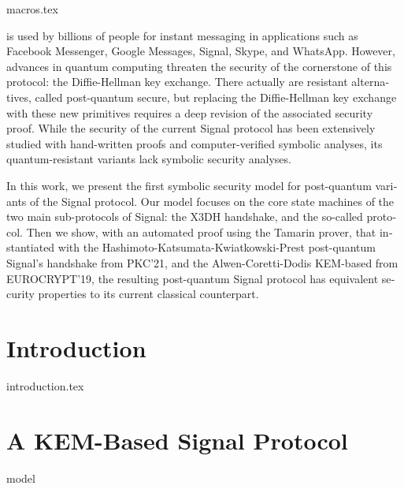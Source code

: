 
\newcommand{\vs}[1]{\vspace*{-#1mm}}

{macros.tex}

\begin{refsegment}
 \label{cha:PQSignal}

\begin{english}

 is used by billions of people for instant 
messaging in applications such as Facebook Messenger, Google Messages, Signal, 
Skype, and WhatsApp. However, advances in quantum computing threaten the 
security of the cornerstone of this protocol: the Diffie-Hellman key exchange. 
There actually are resistant alternatives, called post-quantum secure, but 
replacing the Diffie-Hellman key exchange with these new primitives requires a 
deep revision of the associated security proof. While the security of the 
current Signal protocol has been extensively studied with hand-written proofs 
and computer-verified symbolic analyses, its quantum-resistant variants lack 
symbolic security analyses.

In this work, we present the first symbolic security model for post-quantum 
variants of the Signal protocol. Our model focuses on the core state machines
of the two main sub-protocols of Signal: the X3DH handshake, and the so-called
\emph{\dr} protocol. Then we show, with an automated proof using the Tamarin
prover, that instantiated with the Hashimoto-Katsumata-Kwiatkowski-Prest
post-quantum Signal's handshake from PKC'21, and the Alwen-Coretti-Dodis
KEM-based \dr from EUROCRYPT'19, the resulting post-quantum Signal protocol
has equivalent security properties to its current classical count\-er\-part.

\section{Introduction}\label{PQSignal:sec:introduction}
{introduction.tex}

\section{A KEM-Based Signal Protocol}
\label{sec:pqsignal}
{model}


\end{english}
\end{refsegment}
